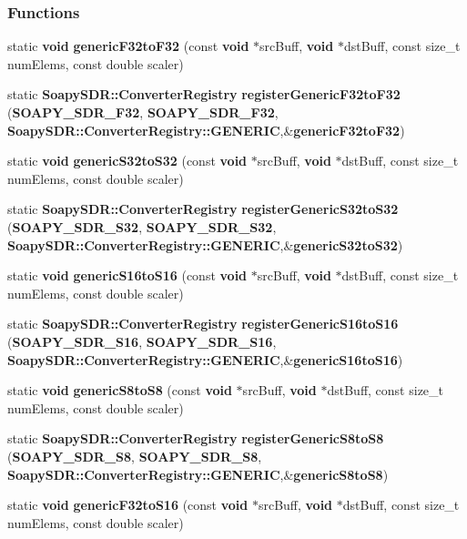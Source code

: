 \subsubsection*{Functions}
\begin{DoxyCompactItemize}
\item 
static {\bf void} {\bf generic\+F32to\+F32} (const {\bf void} $\ast$src\+Buff, {\bf void} $\ast$dst\+Buff, const size\+\_\+t num\+Elems, const double scaler)
\item 
static {\bf Soapy\+S\+D\+R\+::\+Converter\+Registry} {\bf register\+Generic\+F32to\+F32} ({\bf S\+O\+A\+P\+Y\+\_\+\+S\+D\+R\+\_\+\+F32}, {\bf S\+O\+A\+P\+Y\+\_\+\+S\+D\+R\+\_\+\+F32}, {\bf Soapy\+S\+D\+R\+::\+Converter\+Registry\+::\+G\+E\+N\+E\+R\+IC},\&{\bf generic\+F32to\+F32})
\item 
static {\bf void} {\bf generic\+S32to\+S32} (const {\bf void} $\ast$src\+Buff, {\bf void} $\ast$dst\+Buff, const size\+\_\+t num\+Elems, const double scaler)
\item 
static {\bf Soapy\+S\+D\+R\+::\+Converter\+Registry} {\bf register\+Generic\+S32to\+S32} ({\bf S\+O\+A\+P\+Y\+\_\+\+S\+D\+R\+\_\+\+S32}, {\bf S\+O\+A\+P\+Y\+\_\+\+S\+D\+R\+\_\+\+S32}, {\bf Soapy\+S\+D\+R\+::\+Converter\+Registry\+::\+G\+E\+N\+E\+R\+IC},\&{\bf generic\+S32to\+S32})
\item 
static {\bf void} {\bf generic\+S16to\+S16} (const {\bf void} $\ast$src\+Buff, {\bf void} $\ast$dst\+Buff, const size\+\_\+t num\+Elems, const double scaler)
\item 
static {\bf Soapy\+S\+D\+R\+::\+Converter\+Registry} {\bf register\+Generic\+S16to\+S16} ({\bf S\+O\+A\+P\+Y\+\_\+\+S\+D\+R\+\_\+\+S16}, {\bf S\+O\+A\+P\+Y\+\_\+\+S\+D\+R\+\_\+\+S16}, {\bf Soapy\+S\+D\+R\+::\+Converter\+Registry\+::\+G\+E\+N\+E\+R\+IC},\&{\bf generic\+S16to\+S16})
\item 
static {\bf void} {\bf generic\+S8to\+S8} (const {\bf void} $\ast$src\+Buff, {\bf void} $\ast$dst\+Buff, const size\+\_\+t num\+Elems, const double scaler)
\item 
static {\bf Soapy\+S\+D\+R\+::\+Converter\+Registry} {\bf register\+Generic\+S8to\+S8} ({\bf S\+O\+A\+P\+Y\+\_\+\+S\+D\+R\+\_\+\+S8}, {\bf S\+O\+A\+P\+Y\+\_\+\+S\+D\+R\+\_\+\+S8}, {\bf Soapy\+S\+D\+R\+::\+Converter\+Registry\+::\+G\+E\+N\+E\+R\+IC},\&{\bf generic\+S8to\+S8})
\item 
static {\bf void} {\bf generic\+F32to\+S16} (const {\bf void} $\ast$src\+Buff, {\bf void} $\ast$dst\+Buff, const size\+\_\+t num\+Elems, const double scaler)
\item 

\end{DoxyCompactItemize}
